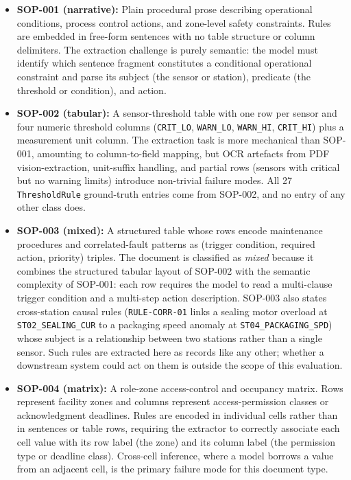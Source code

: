 \documentclass[11pt]{article}
\begin{document}
\begin{itemize}
    \item \textbf{SOP-001 (narrative):}
          Plain procedural prose describing operational conditions, process control
          actions, and zone-level safety constraints.
          Rules are embedded in free-form sentences with no table structure or
          column delimiters.
          The extraction challenge is purely semantic: the model must identify
          which sentence fragment constitutes a conditional operational constraint
          and parse its subject (the sensor or station), predicate (the threshold
          or condition), and action.

    \item \textbf{SOP-002 (tabular):}
          A sensor-threshold table with one row per sensor and four numeric threshold
          columns (\texttt{CRIT\_LO}, \texttt{WARN\_LO}, \texttt{WARN\_HI},
          \texttt{CRIT\_HI}) plus a measurement unit column.
          The extraction task is more mechanical than SOP-001, amounting to column-to-field
          mapping, but OCR artefacts from PDF vision-extraction, unit-suffix handling,
          and partial rows (sensors with critical but no warning limits) introduce
          non-trivial failure modes.
          All 27 \texttt{ThresholdRule} ground-truth entries come from SOP-002,
          and no entry of any other class does.

    \item \textbf{SOP-003 (mixed):}
          A structured table whose rows encode maintenance procedures and
          correlated-fault patterns as (trigger condition, required action, priority)
          triples.
          The document is classified as \textit{mixed} because it combines the
          structured tabular layout of SOP-002 with the semantic complexity of
          SOP-001: each row requires the model to read a multi-clause trigger
          condition and a multi-step action description.
          SOP-003 also states cross-station causal rules (\texttt{RULE-CORR-01}
          links a sealing motor overload at \texttt{ST02\_SEALING\_CUR} to a
          packaging speed anomaly at \texttt{ST04\_PACKAGING\_SPD}) whose
          subject is a relationship between two stations rather than a single
          sensor. Such rules are extracted here as records like any other; whether
          a downstream system could act on them is outside the scope of this
          evaluation.

    \item \textbf{SOP-004 (matrix):}
          A role-zone access-control and occupancy matrix.
          Rows represent facility zones and columns represent access-permission
          classes or acknowledgment deadlines.
          Rules are encoded in individual cells rather than in sentences or table
          rows, requiring the extractor to correctly associate each cell value
          with its row label (the zone) and its column label (the permission type
          or deadline class).
          Cross-cell inference, where a model borrows a value from an adjacent cell,
          is the primary failure mode for this document type.
\end{itemize}
\end{document}
